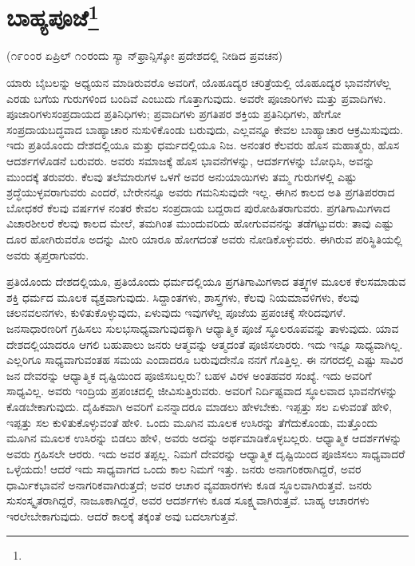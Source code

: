 
\chapter[ಬಾಹ್ಯಪೂಜೆ]{ಬಾಹ್ಯಪೂಜೆ\protect\footnote{}}

\begin{center}
(೧೯೦೦ರ ಏಪ್ರಿಲ್ ೧೦ರಂದು ಸ್ಯಾ ನ್‌ಫ್ರಾನ್ಸಿಸ್ಕೋ ಪ್ರದೇಶದಲ್ಲಿ ನೀಡಿದ ಪ್ರವಚನ)
\end{center}

ಯಾರು ಬೈಬಲನ್ನು ಅಧ್ಯಯನ ಮಾಡಿರುವರೊ ಅವರಿಗೆ, ಯೊಹೂದ್ಯರ ಚರಿತ್ರೆಯಲ್ಲಿ ಯೊಹೂದ್ಯರ ಭಾವನೆಗಳೆಲ್ಲ ಎರಡು ಬಗೆಯ ಗುರುಗಳಿಂದ ಬಂದಿವೆ ಎಂಬುದು ಗೊತ್ತಾಗುವುದು. ಅವರೇ ಪೂಜಾರಿಗಳು ಮತ್ತು ಪ್ರವಾದಿಗಳು. ಪೂಜಾರಿಗಳು\break ಸಂಪ್ರದಾಯದ ಪ್ರತಿನಿಧಿಗಳು; ಪ್ರವಾದಿಗಳು ಪ್ರಗತಿಪರ ಶಕ್ತಿಯ ಪ್ರತಿನಿಧಿಗಳು, ಹೇಗೋ ಸಂಪ್ರದಾಯಬದ್ಧವಾದ ಬಾಹ್ಯಾಚಾರ ನುಸುಳಿಕೊಂಡು ಬರುವುದು, ಎಲ್ಲವನ್ನೂ ಕೇವಲ ಬಾಹ್ಯಾಚಾರ ಆಕ್ರಮಿಸುವುದು. ಇದು ಪ್ರತಿಯೊಂದು ದೇಶದಲ್ಲಿಯೂ ಮತ್ತು ಧರ್ಮದಲ್ಲಿಯೂ ನಿಜ. ಅನಂತರ ಕೆಲವರು ಹೊಸ ಮಹಾತ್ಮರು, ಹೊಸ ಆದರ್ಶಗಳೊಡನೆ ಬರುವರು. ಅವರು ಸಮಾಜಕ್ಕೆ ಹೊಸ ಭಾವನೆಗಳನ್ನು, ಆದರ್ಶಗಳನ್ನು ಬೋಧಿಸಿ, ಅವನ್ನು ಮುಂದಕ್ಕೆ ತರುವರು. ಕೆಲವು ತಲೆಮಾರುಗಳ ಒಳಗೆ ಅವರ ಅನುಯಾಯಿಗಳು ತಮ್ಮ ಗುರುಗಳಲ್ಲಿ ಎಷ್ಟು ಶ್ರದ್ಧೆಯುಳ್ಳವರಾಗುವರು ಎಂದರೆ, ಬೇರೇನನ್ನೂ ಅವರು ಗಮನಿಸುವುದೇ ಇಲ್ಲ. ಈಗಿನ ಕಾಲದ ಅತಿ ಪ್ರಗತಿಪರರಾದ ಬೋಧಕರೆ ಕೆಲವು ವರ್ಷಗಳ ನಂತರ ಕೇವಲ ಸಂಪ್ರದಾಯ ಬದ್ದರಾದ ಪುರೋಹಿತರಾಗುವರು. ಪ್ರಗತಿಗಾಮಿಗಳಾದ ವಿಚಾರಶೀಲರೆ ಕೆಲವು ಕಾಲದ ಮೇಲೆ, ತಮಗಿಂತ ಮುಂದುವರಿದು ಹೋಗುವವನನ್ನು ತಡೆಗಟ್ಟುವರು: ತಾವು ಎಷ್ಟು ದೂರ ಹೋಗಿರುವರೊ ಅದನ್ನು ಮೀರಿ ಯಾರೂ ಹೋಗದಂತೆ ಅವರು ನೋಡಿಕೊಳ್ಳುವರು. ಈಗಿರುವ ಪರಿಸ್ಥಿತಿಯಲ್ಲಿ ಅವರು ತೃಪ್ತರಾಗುವರು.

\vskip 2pt

ಪ್ರತಿಯೊಂದು ದೇಶದಲ್ಲಿಯೂ, ಪ್ರತಿಯೊಂದು ಧರ್ಮದಲ್ಲಿಯೂ ಪ್ರಗತಿಗಾಮಿಗಳಾದ ತತ್ತ್ವಗಳ ಮೂಲಕ ಕೆಲಸಮಾಡುವ ಶಕ್ತಿ ಧರ್ಮದ ಮೂಲಕ ವ್ಯಕ್ತವಾಗುವುದು. ಸಿದ್ದಾಂತಗಳು, ಶಾಸ್ತ್ರಗಳು, ಕೆಲವು ನಿಯಮಾವಳಿಗಳು, ಕೆಲವು ಚಲನವಲನಗಳು, ಕುಳಿತುಕೊಳ್ಳುವುದು, ಏಳುವುದು ಇವುಗಳೆಲ್ಲ ಪೂಜೆಯ ಪ್ರಪಂಚಕ್ಕೆ ಸೇರಿದವುಗಳೆ. ಜನಸಾಧಾರಣರಿಗೆ ಗ್ರಹಿಸಲು ಸುಲಭಸಾಧ್ಯವಾಗುವುದಕ್ಕಾಗಿ ಆಧ್ಯಾತ್ಮಿಕ ಪೂಜೆ ಸ್ಥೂಲರೂಪವನ್ನು ತಾಳುವುದು. ಯಾವ ದೇಶದಲ್ಲಿಯಾದರೂ ಆಗಲಿ ಬಹುಪಾಲು ಜನರು ಆತ್ಮವನ್ನು ಆತ್ಮದಂತೆ ಪೂಜಿಸಲಾರರು. ಇದು ಇನ್ನೂ ಸಾಧ್ಯವಾಗಿಲ್ಲ. ಎಲ್ಲರಿಗೂ ಸಾಧ್ಯವಾಗುವಂತಹ ಸಮಯ ಎಂದಾದರೂ ಬರುವುದೇನೊ ನನಗೆ ಗೊತ್ತಿಲ್ಲ. ಈ ನಗರದಲ್ಲಿ ಎಷ್ಟು ಸಾವಿರ ಜನ ದೇವರನ್ನು ಆಧ್ಯಾತ್ಮಿಕ ದೃಷ್ಟಿಯಿಂದ ಪೂಜಿಸಬಲ್ಲರು? ಬಹಳ ವಿರಳ ಅಂತಹವರ ಸಂಖ್ಯೆ. ಇದು ಅವರಿಗೆ ಸಾಧ್ಯವಿಲ್ಲ. ಅವರು ಇಂದ್ರಿಯ ಪ್ರಪಂಚದಲ್ಲಿ ಜೀವಿಸುತ್ತಿರುವರು. ಅವರಿಗೆ ನಿರ್ದಿಷ್ಟವಾದ ಸ್ಥೂಲವಾದ ಭಾವನೆಗಳನ್ನು ಕೊಡಬೇಕಾಗುವುದು. ದೈಹಿಕವಾಗಿ ಅವರಿಗೆ ಏನನ್ನಾದರೂ ಮಾಡಲು ಹೇಳಬೇಕು. ಇಪ್ಪತ್ತು ಸಲ ಏಳುವಂತೆ ಹೇಳಿ, ಇಪ್ಪತ್ತು ಸಲ ಕುಳಿತುಕೊಳ್ಳುವಂತೆ ಹೇಳಿ. ಒಂದು ಮೂಗಿನ ಮೂಲಕ ಉಸಿರನ್ನು ತೆಗೆದುಕೊಂಡು, ಮತ್ತೊಂದು ಮೂಗಿನ ಮೂಲಕ ಉಸಿರನ್ನು ಬಿಡಲು ಹೇಳಿ, ಅವರು ಅದನ್ನು ಅರ್ಥಮಾಡಿಕೊಳ್ಳಬಲ್ಲರು. ಆಧ್ಯಾತ್ಮಿಕ ಆದರ್ಶಗಳನ್ನು ಅವರು ಗ್ರಹಿಸಲೇ ಆರರು. ಇದು ಅವರ ತಪ್ಪಲ್ಲ. ನಿಮಗೆ ದೇವರನ್ನು ಆಧ್ಯಾತ್ಮಿಕ ದೃಷ್ಟಿಯಿಂದ ಪೂಜಿಸಲು ಸಾಧ್ಯವಾದರೆ ಒಳ್ಳೆಯದು! ಆದರೆ ಇದು ಸಾಧ್ಯವಾಗದ ಒಂದು ಕಾಲ ನಿಮಗೆ ಇತ್ತು. ಜನರು ಅನಾಗರಿಕರಾಗಿದ್ದರೆ, ಅವರ ಧಾರ್ಮಿಕಭಾವನೆ ಅನಾಗರಿಕವಾಗಿರುತ್ತದೆ; ಅವರ ಆಚಾರ ವ್ಯವಹಾರಗಳು ಕೂಡ ಸ್ಥೂಲವಾಗಿರುತ್ತವೆ. ಜನರು ಸುಸಂಸ್ಕೃತರಾಗಿದ್ದರೆ, ನಾಜೂಕಾಗಿದ್ದರೆ, ಅವರ ಆದರ್ಶಗಳು ಕೂಡ ಸೂಕ್ಷ್ಮವಾಗಿರುತ್ತವೆ. ಬಾಹ್ಯ ಆಚಾರಗಳು ಇರಲೇಬೇಕಾಗುವುದು. ಆದರೆ ಕಾಲಕ್ಕೆ ತಕ್ಕಂತೆ ಅವು ಬದಲಾಗುತ್ತವೆ.

